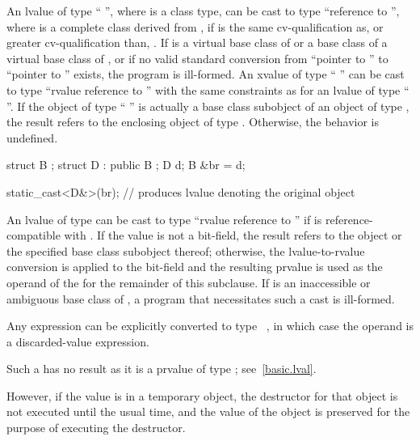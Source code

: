 \pnum
{}%
%
An lvalue of type `` '', where  is a class
type, can be cast to type ``reference to  '', where
 is a complete class derived from ,
if  is the
same cv-qualification as, or greater cv-qualification than,
. If  is a virtual base class of 
or a base class of a virtual base class of ,
or if no valid standard conversion from ``pointer to ''
to ``pointer to '' exists, the program is ill-formed.
An xvalue of type
`` '' can be cast to type ``rvalue reference to
 '' with the same constraints as for an lvalue of
type `` ''. If the object
of type `` '' is actually a base class subobject of an object
of type , the result refers to the enclosing object of type
. Otherwise, the behavior is undefined.
\begin{example}
\begin{codeblock}
struct B { };
struct D : public B { };
D d;
B &br = d;

static_cast<D&>(br);            // produces lvalue denoting the original  object
\end{codeblock}
\end{example}

\pnum
An lvalue
of type  can be cast to type ``rvalue
reference to '' if  is reference-compatible with
. If the value is not a bit-field,
the result refers to the object or the specified base class subobject
thereof; otherwise, the lvalue-to-rvalue conversion
is applied to the bit-field and the resulting prvalue is used as the
operand of the  for the remainder of this subclause.
If  is an inaccessible or
ambiguous base class of ,
a program that necessitates such a cast is ill-formed.

\pnum
Any expression can be explicitly converted to type \cv{}~,
in which case the operand is a discarded-value expression.
\begin{note}
Such a  has no result
as it is a prvalue of type ; see~\ref{basic.lval}.
\end{note}
\begin{note}
However, if the value is in a temporary
object, the destructor for that
object is
not executed until the usual time, and the value of the object is
preserved for the purpose of executing the destructor.
\end{note}

